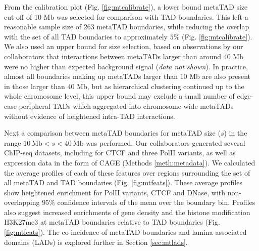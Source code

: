 \documentclass[a4paper,11pt,oneside]{book}
\begin{document}
From the calibration plot (Fig. \ref{fig:mtcalibrate}), a lower bound metaTAD size cut-off of 10 Mb was selected for comparison with TAD boundaries. This left a reasonable sample size of $263$ metaTAD boundaries, while reducing the overlap with the set of all TAD boundaries to approximately $5\%$ (Fig. \ref{fig:mtcalibrate}). We also used an upper bound for size selection, based on observations by our collaborators that interactions between metaTADs larger than around $40$ Mb were no higher than expected background signal (\emph{data not shown}). In practice, almost all boundaries making up metaTADs larger than $10$ Mb are also present in those larger than $40$ Mb, but as hierarchical clustering continued up to the whole chromosome level, this upper bound may exclude a small number of edge-case peripheral TADs which aggregated into chromosome-wide metaTADs without evidence of heightened intra-TAD interactions.

Next a comparison between metaTAD boundaries for metaTAD size ($s$) in the range $10~\textrm{Mb} < s < 40~\textrm{Mb}$ was performed. Our collaborators generated several ChIP-seq datasets, including for CTCF and three PolII variants, as well as expression data in the form of CAGE (Methods \ref{meth:metadata}). We calculated the average profiles of each of these features over regions surrounding the set of all metaTAD and TAD boundaries (Fig. \ref{fig:mtfeats}). These average profiles show heightened enrichment for PolII variants, CTCF and DNase, with non-overlapping $95\%$ confidence intervals of the mean over the boundary bin. Profiles also suggest increased enrichments of gene density and the histone modification H3K27me3 at metaTAD boundaries relative to TAD boundaries (Fig. \ref{fig:mtfeats}). The co-incidence of metaTAD boundaries and lamina associated domains (LADs) is explored further in Section \ref{sec:mtlads}.
\end{document}

